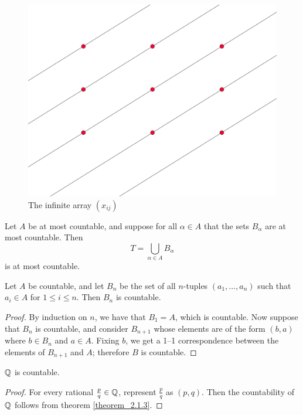 \begin{figure}
  \centering
  \includegraphics[scale = 0.05]{Figures/diagonalizationArray.png}
  \caption{The infinite array $(x_{ij})$}
  \label{fig_2.1}
\end{figure}

\begin{corollary}
  Let $A$ be  at most countable, and suppose for all  $\alpha \in A$ that the sets
  $B_{\alpha}$ are  at most countable. Then
  \begin{equation*}
    T=\bigcup_{\alpha \in A}{B_{\alpha}}
  \end{equation*}
  is  at most countable.
\end{corollary}

\begin{theorem}\label{theorem_2.1.3}
  Let $A$ be countable, and let  $B_n$ be the set of all  $n$-tuples  $(a_1, \dots,
  a_n)$
  such that $a_i \in A$ for  $1 \leq i \leq n$. Then  $B_n$ is countable.
\end{theorem}
\begin{proof}
  By induction on $n$, we have that  $B_1=A$, which is countable. Now suppose that
  $B_n$ is countable, and consider  $B_{n+1}$ whose elements are of the form
  $(b,a)$ where  $b \in B_n$ and  $a \in A$. Fixing  $b$, we get a 1--1
  correspondence between the elements of  $B_{n+1}$ and  $A$; therefore  $B$ is
  countable.
\end{proof}
\begin{corollary}
  $\mathbb{Q}$ is countable.
\end{corollary}
\begin{proof}
  For every rational $\frac{p}{q} \in \mathbb{Q}$, represent $\frac{p}{q}$ as $(p,q)$. Then
  the countability of $\mathbb{Q}$ follows from theorem \ref{theorem_2.1.3}.
\end{proof}

